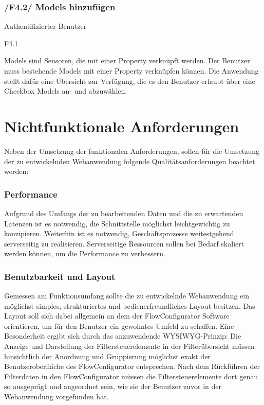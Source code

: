 \subsubsection{/F4.2/ Models hinzufügen}

\begin{description}[leftmargin=8em,style=nextline]
\item[Akteure] Authentifizierter Benutzer
\item[Includes] F4.1
\item[Beschreibung]
Models sind Sensoren, die mit einer Property verknüpft werden. Der Benutzer muss bestehende Models mit einer Property verknüpfen können. Die Anwendung stellt dafür eine Übersicht zur Verfügung, die es den Benutzer erlaubt über eine Checkbox Models an- und abzuwählen.
\end{description}

\section{Nichtfunktionale Anforderungen}
\label{sec:Analyse:Nichtfuntionale Anforderungen}

Neben der Umsetzung der funktionalen Anforderungen, sollen für die Umsetzung der zu entwickelnden Webanwendung folgende Qualitätsanforderungen beachtet werden:

\subsubsection{Performance}

Aufgrund des Umfangs der zu bearbeitenden Daten und die zu erwartenden Latenzen ist es notwendig, die Schnittstelle möglichst leichtgewichtig zu konzipieren. Weiterhin ist es notwendig, Geschäftsprozesse weitestgehend serverseitig zu realisieren. Serverseitige Ressourcen sollen bei Bedarf skaliert werden können, um die Performance zu verbessern.

\subsubsection{Benutzbarkeit und Layout}
\label{sec:Analyse:Benutzbarkeit und Layout}

Gemessen am Funktionsumfang sollte die zu entwickelnde Webanwendung ein möglichst simples, strukturiertes und bedienerfreundliches Layout besitzen. Das Layout soll sich dabei allgemein an dem der FlowConfigurator Software orientieren, um für den Benutzer ein gewohntes Umfeld zu schaffen. Eine Besonderheit ergibt sich durch das anzuwendende \ac{WYSIWYG}-Prinzip: Die Anzeige und Darstellung der Filtersteuerelemente in der Filterübersicht müssen hinsichtlich der Anordnung und Gruppierung möglichst exakt der Benutzeroberfläche des FlowConfigurator entsprechen. Nach dem Rückführen der Filterdaten in den FlowConfigurator müssen die Filtersteuerelemente dort genau so ausgeprägt und angeordnet sein, wie sie der Benutzer zuvor in der Webanwendung vorgefunden hat.

